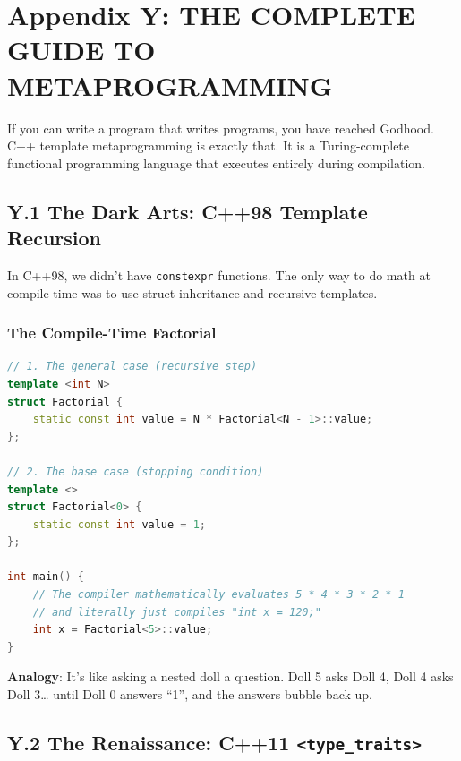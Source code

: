 \hypertarget{appendix-y-the-complete-guide-to-metaprogramming}{%
\section{Appendix Y: THE COMPLETE GUIDE TO
METAPROGRAMMING}\label{appendix-y-the-complete-guide-to-metaprogramming}}

If you can write a program that writes programs, you have reached
Godhood. C++ template metaprogramming is exactly that. It is a
Turing-complete functional programming language that executes entirely
during compilation.

\hypertarget{y.1-the-dark-arts-c98-template-recursion}{%
\subsection{Y.1 The Dark Arts: C++98 Template
Recursion}\label{y.1-the-dark-arts-c98-template-recursion}}

In C++98, we didn't have \passthrough{\lstinline!constexpr!} functions.
The only way to do math at compile time was to use struct inheritance
and recursive templates.

\hypertarget{the-compile-time-factorial}{%
\subsubsection{The Compile-Time
Factorial}\label{the-compile-time-factorial}}

\begin{lstlisting}[language={C++}]
// 1. The general case (recursive step)
template <int N>
struct Factorial {
    static const int value = N * Factorial<N - 1>::value;
};

// 2. The base case (stopping condition)
template <>
struct Factorial<0> {
    static const int value = 1;
};

int main() {
    // The compiler mathematically evaluates 5 * 4 * 3 * 2 * 1 
    // and literally just compiles "int x = 120;"
    int x = Factorial<5>::value; 
}
\end{lstlisting}

\textbf{Analogy}: It's like asking a nested doll a question. Doll 5 asks
Doll 4, Doll 4 asks Doll 3\ldots{} until Doll 0 answers ``1'', and the
answers bubble back up.

\hypertarget{y.2-the-renaissance-c11-type_traits}{%
\subsection{\texorpdfstring{Y.2 The Renaissance: C++11
\texttt{\textless{}type\_traits\textgreater{}}}{Y.2 The Renaissance: C++11 \textless type\_traits\textgreater{}}}\label{y.2-the-renaissance-c11-type_traits}}

